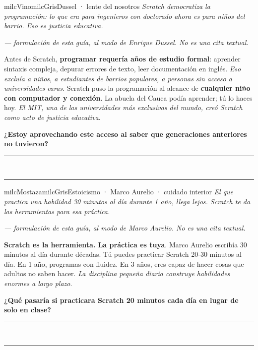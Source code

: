 \documentclass[11pt,letterpaper]{article}
\newcommand{\linead}[1]{\noindent\color{milcLinea}\rule{#1}{0.5pt}\color{milcNegro}}
\begin{document}
\begin{softbox}{milcVino}{milcGris}{Dussel · lente del nosotros}
\textit{Scratch democratiza la programación: lo que era para ingenieros con doctorado ahora es para niños del barrio. Eso es justicia educativa.}

{\footnotesize\itshape\color{milcNegro!70}--- formulación de esta guía, al modo de Enrique Dussel. No es una cita textual.}

Antes de Scratch, \textbf{programar requería años de estudio formal}: aprender sintaxis compleja, depurar errores de texto, leer documentación en inglés. \emph{Eso excluía a niños, a estudiantes de barrios populares, a personas sin acceso a universidades caras}. Scratch puso la programación al alcance de \textbf{cualquier niño con computador y conexión}. La abuela del Cauca podía aprender; tú lo haces hoy. \emph{El MIT, una de las universidades más exclusivas del mundo, creó Scratch como acto de justicia educativa}.

\textbf{¿Estoy aprovechando este acceso al saber que generaciones anteriores no tuvieron?}
\end{softbox}
\linead{\linewidth}\\[1mm]
\linead{\linewidth}

\begin{softbox}{milcMostaza}{milcGris}{Estoicismo · Marco Aurelio · cuidado interior}
\textit{El que practica una habilidad 30 minutos al día durante 1 año, llega lejos. Scratch te da las herramientas para esa práctica.}

{\footnotesize\itshape\color{milcNegro!70}--- formulación de esta guía, al modo de Marco Aurelio. No es una cita textual.}

\textbf{Scratch es la herramienta. La práctica es tuya}. Marco Aurelio escribía 30 minutos al día durante décadas. Tú puedes practicar Scratch 20-30 minutos al día. En 1 año, programas con fluidez. En 3 años, eres capaz de hacer cosas que adultos no saben hacer. \emph{La disciplina pequeña diaria construye habilidades enormes a largo plazo}.

\textbf{¿Qué pasaría si practicara Scratch 20 minutos cada día en lugar de solo en clase?}
\end{softbox}
\linead{\linewidth}\\[1mm]
\linead{\linewidth}
\end{document}
